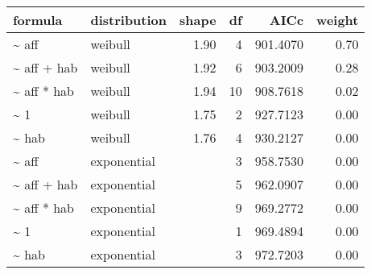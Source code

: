 \begin{table}[ht]
\centering
\begin{tabular}{llrrrr}
 formula & distribution & shape & df & AICc & weight \\ 
  \hline
\~{} aff & weibull & 1.90 & 4 & 901.4070 & 0.70 \\ 
  \~{} aff + hab & weibull & 1.92 & 6 & 903.2009 & 0.28 \\ 
  \~{} aff * hab & weibull & 1.94 & 10 & 908.7618 & 0.02 \\ 
  \~{} 1 & weibull & 1.75 & 2 & 927.7123 & 0.00 \\ 
  \~{} hab & weibull & 1.76 & 4 & 930.2127 & 0.00 \\ 
  \~{} aff & exponential &  & 3 & 958.7530 & 0.00 \\ 
  \~{} aff + hab & exponential &  & 5 & 962.0907 & 0.00 \\ 
  \~{} aff * hab & exponential &  & 9 & 969.2772 & 0.00 \\ 
  \~{} 1 & exponential &  & 1 & 969.4894 & 0.00 \\ 
  \~{} hab & exponential &  & 3 & 972.7203 & 0.00 \\ 
  \end{tabular}
\label{tab:brach}
\end{table}
